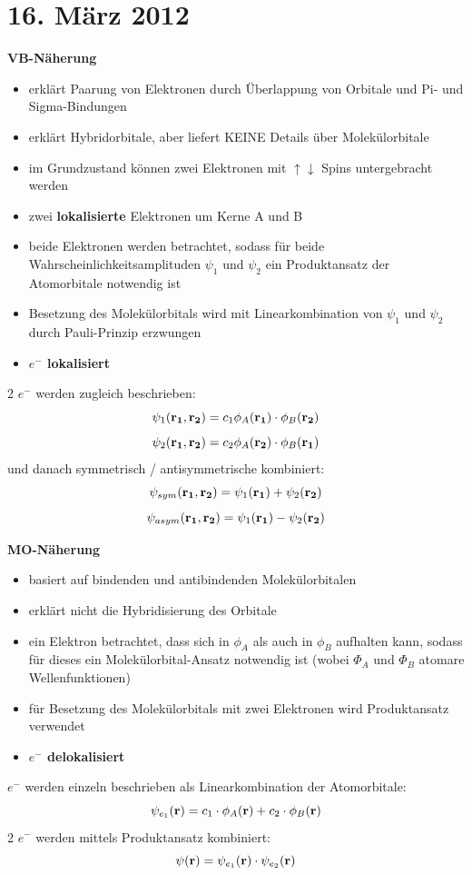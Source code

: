 \section{16. März 2012}

\label{q:41}

\textbf{VB-Näherung}
\begin{itemize}  
    \item erklärt Paarung von Elektronen durch Überlappung von Orbitale und Pi- und Sigma-Bindungen
    \item erklärt Hybridorbitale, aber liefert KEINE Details über Molekülorbitale
    \item im Grundzustand können zwei Elektronen mit $\uparrow \downarrow$ Spins untergebracht werden
    \item zwei \textbf{lokalisierte} Elektronen um Kerne A und B
    \item beide Elektronen werden betrachtet, sodass für beide Wahrscheinlichkeitsamplituden $\psi_1$ und $\psi_2$ ein Produktansatz der Atomorbitale notwendig ist
    \item Besetzung des Molekülorbitals wird mit Linearkombination von $\psi_1$ und $\psi_2$ durch Pauli-Prinzip erzwungen
    \item \textbf{$e^-$ lokalisiert}
\end{itemize}
2 $e^-$ werden zugleich beschrieben:
\[\psi_1(\vb{r_1},\vb{r_2}) = c_1 \phi_A(\vb{r_1}) \cdot \phi_B(\vb{r_2})\]
\[\psi_2(\vb{r_1},\vb{r_2}) = c_2 \phi_A(\vb{r_2}) \cdot \phi_B(\vb{r_1})\]
und danach symmetrisch / antisymmetrische kombiniert: 
\[\psi_{sym}(\vb{r_1},\vb{r_2}) = \psi_1(\vb{r_1}) + \psi_2(\vb{r_2})\]
\[\psi_{asym}(\vb{r_1},\vb{r_2}) = \psi_1(\vb{r_1}) - \psi_2(\vb{r_2})\]

\noindent
\textbf{MO-Näherung}
\begin{itemize}
    \item basiert auf bindenden und antibindenden Molekülorbitalen
    \item erklärt nicht die Hybridisierung des Orbitale
    \item ein Elektron betrachtet, dass sich in $\phi_A$ als auch in $\phi_B$ aufhalten kann, sodass für dieses ein Molekülorbital-Ansatz notwendig ist (wobei $\Phi_A$ und $\Phi_B$ atomare Wellenfunktionen)
    \item für Besetzung des Molekülorbitals mit zwei Elektronen wird Produktansatz verwendet
    \item \textbf{$e^-$ delokalisiert}
\end{itemize}
$e^-$ werden einzeln beschrieben als Linearkombination der Atomorbitale:
\[\psi_{e_1}(\vb{r}) = c_1 \cdot \phi_A(\vb{r}) +c_2 \cdot \phi_B(\vb{r})\]
2 $e^-$ werden mittels Produktansatz kombiniert:
\[\psi(\vb{r}) = \psi_{e_1}(\vb{r}) \cdot \psi_{e_2}(\vb{r}) \]

